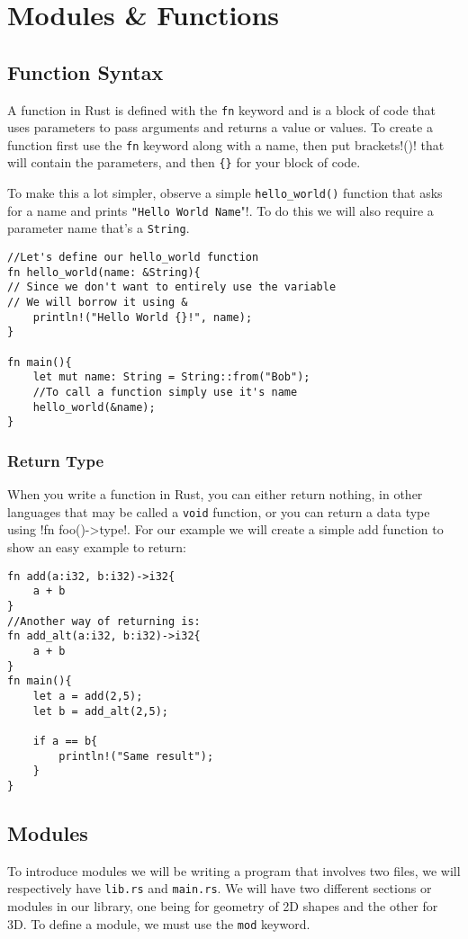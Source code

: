 \chapter{Modules \& Functions}
\section{Function Syntax}
\par A function in Rust is defined with the \verb!fn! keyword and is a block of code 
that uses parameters to pass arguments and returns a value or values. To create a 
function first use the \verb!fn! keyword along with a name, then put brackets!()! that will 
contain the parameters, and then \verb!{}! for your block of code.

\par To make this a lot simpler, observe a simple \verb!hello_world()! function that asks 
for a name and prints \verb!"Hello World Name!"!. To do this we will also require a 
parameter name that's a \verb!String!. 

\begin{lstlisting}
//Let's define our hello_world function
fn hello_world(name: &String){
// Since we don't want to entirely use the variable 
// We will borrow it using &
    println!("Hello World {}!", name);
}

fn main(){
    let mut name: String = String::from("Bob");
    //To call a function simply use it's name
    hello_world(&name);
}
\end{lstlisting}

\subsection{Return Type}
When you write a function in Rust, you can either return nothing, in other 
languages that may be called a \verb!void! function, or you can return a data type using 
!fn foo()->type{}!. For our example we will create a simple add function to show an 
easy example to return: 

\begin{lstlisting}
fn add(a:i32, b:i32)->i32{
    a + b 
}
//Another way of returning is: 
fn add_alt(a:i32, b:i32)->i32{
    a + b
}
fn main(){
    let a = add(2,5);
    let b = add_alt(2,5);
    
    if a == b{
        println!("Same result");
    }
}   
\end{lstlisting}

\section{Modules}
\par To introduce modules we will be writing a program that involves two files, 
we will respectively have \verb!lib.rs! and \verb!main.rs!. We will have two different sections or modules in our library, one being for geometry of 2D shapes and the other for 3D. To define a module, we must use the \verb!mod! keyword.

